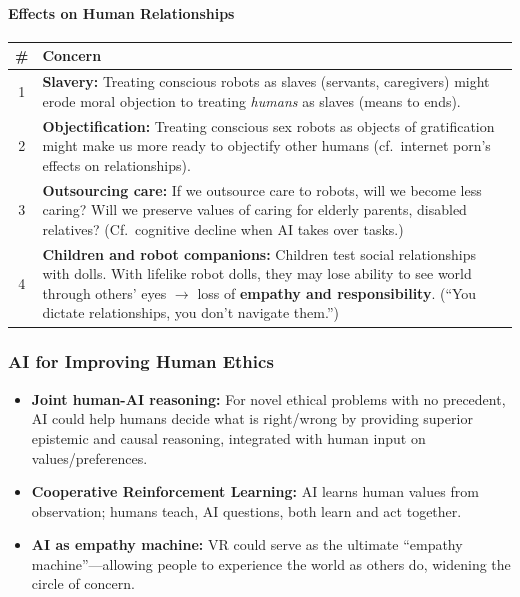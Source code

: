 \paragraph*{Effects on Human Relationships}

\begin{center}
\renewcommand{\arraystretch}{1.3}
\begin{tabular}{@{} c p{9.5cm} @{}}
\toprule
\textbf{\#} & \textbf{Concern} \\
\midrule
1 & \textbf{Slavery:} Treating conscious robots as slaves (servants, caregivers) might erode moral objection to treating \textit{humans} as slaves (means to ends). \\
2 & \textbf{Objectification:} Treating conscious sex robots as objects of gratification might make us more ready to objectify other humans (cf.\ internet porn's effects on relationships). \\
3 & \textbf{Outsourcing care:} If we outsource care to robots, will we become less caring? Will we preserve values of caring for elderly parents, disabled relatives? (Cf.\ cognitive decline when AI takes over tasks.) \\
4 & \textbf{Children and robot companions:} Children test social relationships with dolls. With lifelike robot dolls, they may lose ability to see world through others' eyes $\to$ loss of \textbf{empathy and responsibility}. (``You dictate relationships, you don't navigate them.'') \\
\bottomrule
\end{tabular}
\end{center}

\bigseparator

\subsubsection{AI for Improving Human Ethics}

\begin{keybox}
\begin{itemize}
  \item \textbf{Joint human-AI reasoning:} For novel ethical problems with no precedent, AI could help humans decide what is right/wrong by providing superior epistemic and causal reasoning, integrated with human input on values/preferences.
  \item \textbf{Cooperative Reinforcement Learning:} AI learns human values from observation; humans teach, AI questions, both learn and act together.
  \item \textbf{AI as empathy machine:} VR could serve as the ultimate ``empathy machine''---allowing people to experience the world as others do, widening the circle of concern.
\end{itemize}
\end{keybox}

